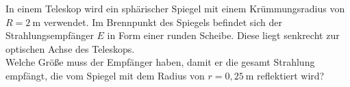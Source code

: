 \begin{Exercise}[difficulty = 3, origin = {IV. IPhO, 1970}, label = sphmi, title = Teleskop]
	In einem Teleskop wird ein sphärischer Spiegel mit einem Krümmungsradius von $R = 2~\mathrm{m}$ verwendet. Im Brennpunkt des Spiegels befindet sich der Strahlungsempfänger $E$ in Form einer runden Scheibe.  Diese liegt senkrecht zur optischen Achse des Teleskops.\\
	Welche Größe muss der Empfänger haben, damit er die gesamt Strahlung empfängt, die vom Spiegel mit dem Radius von $r = 0,25~\mathrm{m}$ reflektiert wird?
\end{Exercise}